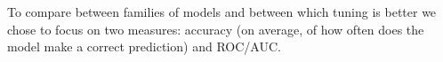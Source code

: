 \documentclass[../../project.tex]{subfiles}
\begin{document}
To compare between families of models and between which tuning is better we chose to focus on two measures: accuracy (on average, of how often does the model make a correct prediction) and ROC/AUC.
	
	
\end{document}

